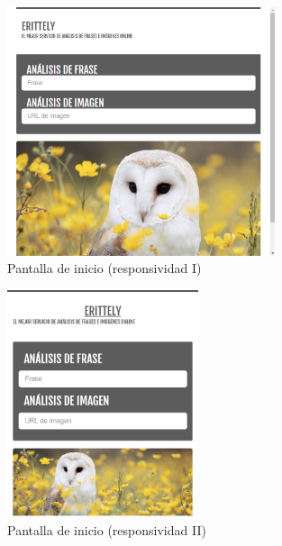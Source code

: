 \documentclass[a4paper]{article}
\begin{document}
\begin{figure}[htp!]
    \centering
    \caption{Pantalla de inicio (responsividad I)}
    \label{fig:1}
    \includegraphics[width=0.7\textwidth]{1}
\end{figure}
\begin{figure}[htp!]
    \centering
    \caption{Pantalla de inicio (responsividad II)}
    \label{fig:2}
    \includegraphics[width=0.5\textwidth]{2}
\end{figure}
\end{document}
